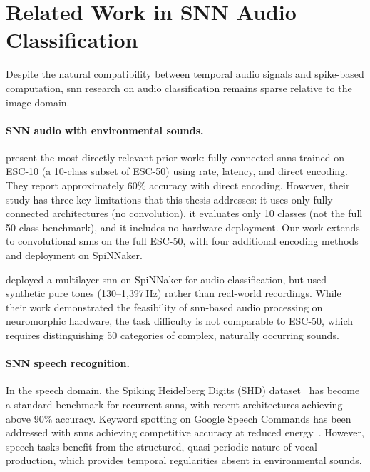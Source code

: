 \section{Related Work in SNN Audio Classification}
\label{sec:related-audio-snn}

Despite the natural compatibility between temporal audio signals and spike-based computation, \gls{snn} research on audio classification remains sparse relative to the image domain.

\paragraph{SNN audio with environmental sounds.}
\citet{larroza2025} present the most directly relevant prior work: fully connected \glspl{snn} trained on ESC-10 (a 10-class subset of ESC-50) using rate, latency, and direct encoding. They report approximately 60\% accuracy with direct encoding. However, their study has three key limitations that this thesis addresses: it uses only fully connected architectures (no convolution), it evaluates only 10 classes (not the full 50-class benchmark), and it includes no hardware deployment. Our work extends to convolutional \glspl{snn} on the full ESC-50, with four additional encoding methods and deployment on SpiNNaker.

\citet{dominguezmorales2016} deployed a multilayer \gls{snn} on SpiNNaker for audio classification, but used synthetic pure tones (130--1{,}397\,Hz) rather than real-world recordings. While their work demonstrated the feasibility of \gls{snn}-based audio processing on neuromorphic hardware, the task difficulty is not comparable to ESC-50, which requires distinguishing 50 categories of complex, naturally occurring sounds.

\paragraph{SNN speech recognition.}
In the speech domain, the Spiking Heidelberg Digits (SHD) dataset~\citep{cramer2020} has become a standard benchmark for recurrent \glspl{snn}, with recent architectures achieving above 90\% accuracy. Keyword spotting on Google Speech Commands has been addressed with \glspl{snn} achieving competitive accuracy at reduced energy~\citep{pellegrini2021}. However, speech tasks benefit from the structured, quasi-periodic nature of vocal production, which provides temporal regularities absent in environmental sounds.

